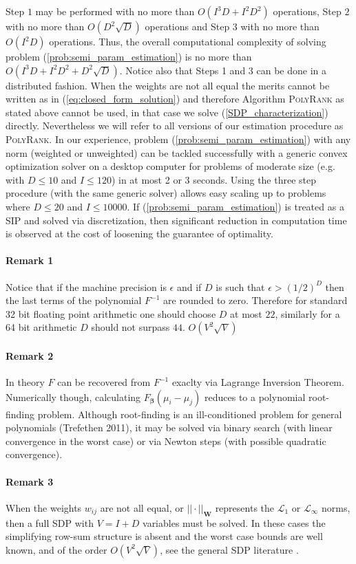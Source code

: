 \documentclass[twoside,11pt]{article}
\begin{document}
Step $1$ may be performed with no more than $O(I^3D+I^2D^2)$ operations, Step $2$ with no more than $O(D^2\sqrt{D})$ operations and Step $3$ with no more than $O(I^2D)$ operations. Thus, the overall computational complexity of solving problem (\ref{prob:semi_param_estimation}) is no more than $O(I^3D+I^2D^2+D^2\sqrt{D})$. Notice also that Steps 1 and 3 can be done in a distributed fashion. When the weights are not all equal the merits cannot be written as in (\ref{eq:closed_form_solution}) and therefore Algorithm \textsc{PolyRank} as stated above cannot be used, in that case we solve (\ref{SDP_characterization}) directly. Nevertheless we will refer to all versions of our estimation procedure as  \textsc{PolyRank}. In our experience, problem (\ref{prob:semi_param_estimation}) with any norm (weighted or unweighted) can be tackled successfully with a generic convex optimization solver on a desktop computer for problems of moderate size (e.g. with $D\leq 10$ and $I\leq 120$) in at most 2 or 3 seconds. Using the three step procedure (with the same generic solver) allows easy scaling up to problems where $D\leq 20$ and $I\leq 10000$. If  (\ref{prob:semi_param_estimation}) is treated as a SIP and solved via discretization, then significant reduction in computation time is observed at the cost of loosening the guarantee of optimality.

\paragraph{Remark 1} Notice that if the machine precision is $\epsilon$ and if $D$ is such that $\epsilon> (1/2)^D$ then the last terms of the polynomial $F^{-1}$ are rounded to zero. Therefore for standard 32 bit floating point arithmetic one should choose $D$ at most $22$, similarly for a 64 bit arithmetic $D$ should not surpass $44$. 
 $O(V^2\sqrt{V})$  
\paragraph{Remark 2} In theory $F$ can be recovered from  $F^{-1}$ exaclty via Lagrange Inversion Theorem. Numerically though, calculating $F_{\boldsymbol{\beta}}(\mu_i - \mu_j)$ reduces to a polynomial root-finding problem. Although root-finding is an ill-conditioned problem for general polynomials (Trefethen 2011), it may be solved via binary search  (with linear convergence in the worst case) or via Newton steps (with possible quadratic convergence).
\paragraph{Remark 3} When the weights $w_{ij}$ are not all equal, or $||\cdot||_{\boldsymbol{W}}$ represents the $\mathcal{L}_1$ or $\mathcal{L}_{\infty}$ norms, then a full SDP with $V = I+D$ variables must be solved. In these cases the simplifying row-sum structure is absent and the worst case bounds are well known, and of the order $O(V^2\sqrt{V})$, see the general SDP literature \citep{vandenberghe}. 
\end{document}
